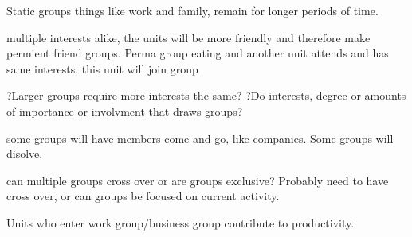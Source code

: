 Static groups things like work and family, remain for longer periods of time.

multiple interests alike, the units will be more friendly and therefore make permient friend groups.
Perma group eating and another unit attends and has same interests, this unit will join group

?Larger groups require more interests the same?
?Do interests, degree or amounts of importance or involvment that draws groups?

some groups will have members come and go, like companies. 
Some groups will disolve.

can multiple groups cross over or are groups exclusive? Probably need to have cross over, or can groups be focused on current activity.


Units who enter work group/business group contribute to productivity. 





